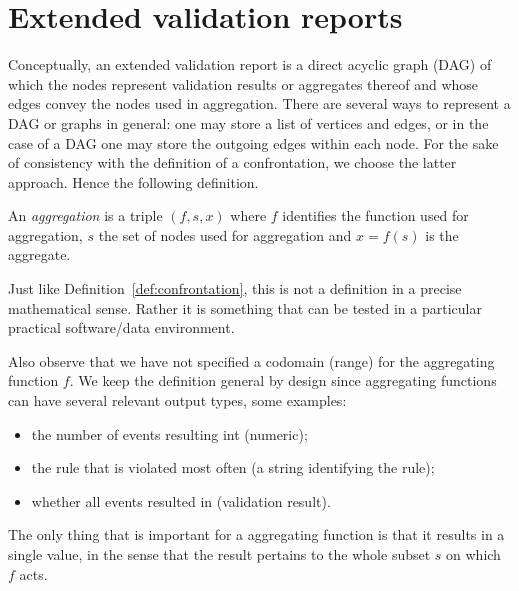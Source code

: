 \section{Extended validation reports}
\label{sect:extended}
Conceptually, an extended validation report is a direct acyclic graph (DAG) of
which the nodes represent validation results or aggregates thereof and whose
edges convey the nodes used in aggregation. There are several ways to represent
a DAG or graphs in general: one may store a list of vertices and edges, or in
the case of a DAG one may store the outgoing edges within each node.  For the sake
of consistency with the definition of a confrontation, we choose the latter
approach. Hence the following definition.
%
\begin{definition}[aggregation]
\label{def:aggregation}
An \emph{aggregation} is a triple $(f,s,x)$ where $f$ identifies the function
used for aggregation, $s$ the set of nodes used for aggregation and $x=f(s)$ is
the aggregate.
\end{definition}
Just like Definition~\ref{def:confrontation}, this is not a definition in a
precise mathematical sense. Rather it is something that can be tested in a
particular practical software/data environment. 

Also observe that we have not specified a codomain (range) for the aggregating
function $f$. We keep the definition general by design since aggregating
functions can have several relevant output types, some examples:
\begin{itemize}
\item the number of events resulting int \waar{} (numeric);
\item the rule that is violated most often (a string identifying the rule);
\item whether all events resulted in \waar{} (validation result).
\end{itemize}
The only thing that is important for a aggregating function is that it results
in a single value, in the sense that the result pertains to the whole subset
$s$ on which $f$ acts.

